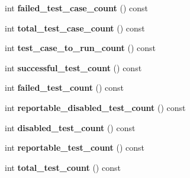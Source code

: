 \begin{DoxyCompactItemize}
\item 
\hypertarget{classtesting_1_1_unit_test_a1084a93a4b92c6506738e309b0a9eeea}{}int {\bfseries failed\+\_\+test\+\_\+case\+\_\+count} () const \label{classtesting_1_1_unit_test_a1084a93a4b92c6506738e309b0a9eeea}

\item 
\hypertarget{classtesting_1_1_unit_test_a6802793a0be9cee17380fdd8c7161fcd}{}int {\bfseries total\+\_\+test\+\_\+case\+\_\+count} () const \label{classtesting_1_1_unit_test_a6802793a0be9cee17380fdd8c7161fcd}

\item 
\hypertarget{classtesting_1_1_unit_test_abb7330165eb5be7beac3f7e6ced5fcdd}{}int {\bfseries test\+\_\+case\+\_\+to\+\_\+run\+\_\+count} () const \label{classtesting_1_1_unit_test_abb7330165eb5be7beac3f7e6ced5fcdd}

\item 
\hypertarget{classtesting_1_1_unit_test_a4795d58351f03498d5823a743b0722c5}{}int {\bfseries successful\+\_\+test\+\_\+count} () const \label{classtesting_1_1_unit_test_a4795d58351f03498d5823a743b0722c5}

\item 
\hypertarget{classtesting_1_1_unit_test_aeda0f8ca87adf65f634c3d6d9ab98598}{}int {\bfseries failed\+\_\+test\+\_\+count} () const \label{classtesting_1_1_unit_test_aeda0f8ca87adf65f634c3d6d9ab98598}

\item 
\hypertarget{classtesting_1_1_unit_test_aa5eaf98c5d9cc0afe501ac03e6414188}{}int {\bfseries reportable\+\_\+disabled\+\_\+test\+\_\+count} () const \label{classtesting_1_1_unit_test_aa5eaf98c5d9cc0afe501ac03e6414188}

\item 
\hypertarget{classtesting_1_1_unit_test_a4cbd084447b74784d1bb85c1ed4b96d5}{}int {\bfseries disabled\+\_\+test\+\_\+count} () const \label{classtesting_1_1_unit_test_a4cbd084447b74784d1bb85c1ed4b96d5}

\item 
\hypertarget{classtesting_1_1_unit_test_aa32cb4f3cd34564a5c641bd409f8f83b}{}int {\bfseries reportable\+\_\+test\+\_\+count} () const \label{classtesting_1_1_unit_test_aa32cb4f3cd34564a5c641bd409f8f83b}

\item 
\hypertarget{classtesting_1_1_unit_test_a54315b233d354693b9aa1184cf2996de}{}int {\bfseries total\+\_\+test\+\_\+count} () const \label{classtesting_1_1_unit_test_a54315b233d354693b9aa1184cf2996de}


\end{DoxyCompactItemize}
